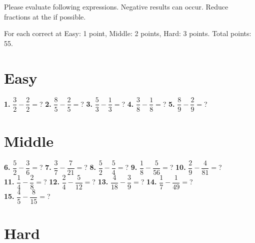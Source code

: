 \documentclass[a4paper]{article}
\begin{document}
\begin{Large}

Please evaluate following expressions. Negative results can occur. Reduce fractions at the if possible.

For each correct at Easy: 1 point, Middle: 2 points, Hard: 3 points. Total points: 55.

\section* {Easy}
		
\textbf{1.} $\dfrac{3}{2} - \dfrac{2}{2} =$? \hspace{0.2cm}
\textbf{2.} $\dfrac{8}{5} - \dfrac{2}{5} =$? \hspace{0.2cm}
\textbf{3.} $\dfrac{5}{3} - \dfrac{1}{3} =$? \hspace{0.2cm}
\textbf{4.} $\dfrac{3}{8} - \dfrac{1}{8} =$? \hspace{0.2cm}
\textbf{5.} $\dfrac{8}{9} - \dfrac{2}{9} =$?

		
\section* {Middle}
		
\textbf{6.} $\dfrac{5}{2} - \dfrac{3}{6} =$? \hspace{0.2cm}
\textbf{7.} $\dfrac{3}{7} - \dfrac{7}{21} =$? \hspace{0.2cm}
\textbf{8.} $\dfrac{5}{2} - \dfrac{5}{4} =$? \hspace{0.2cm}
\textbf{9.} $\dfrac{1}{8} - \dfrac{5}{56} =$? \hspace{0.2cm}
\textbf{10.} $\dfrac{2}{9} - \dfrac{4}{81} =$? \\[1cm]
\textbf{11.} $\dfrac{1}{4} - \dfrac{2}{8}=$? \hspace{0.2cm}
\textbf{12.} $\dfrac{2}{4} - \dfrac{5}{12} =$? \hspace{0.2cm}
\textbf{13.} $\dfrac{4}{18} - \dfrac{3}{9} =$? \hspace{0.2cm}
\textbf{14.} $\dfrac{1}{7} - \dfrac{1}{49} =$? \hspace{0.2cm} \\[1cm]
\textbf{15.} $\dfrac{4}{5} - \dfrac{8}{15} =$?
		
\section* {Hard}


\end{Large}
\end{document}
